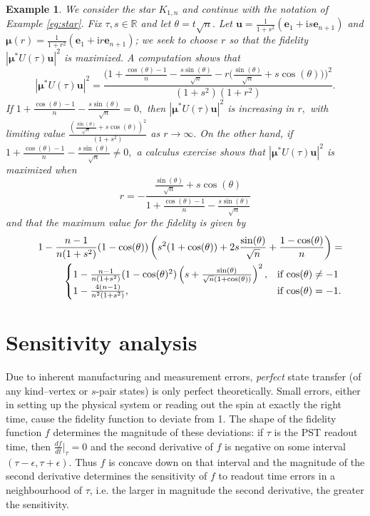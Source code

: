 \documentclass{article}
\numberwithin{equation}{section}
\newtheorem{ex}[lemma]{Example}
\newcommand{\be}{\mathbf e}
\newcommand{\bu}{\mathbf u}
\newcommand{\bmu}{{\boldsymbol{\mu}}}
\def\ii{\mathrm{i}}
\begin{document}
{\begin{ex}\rm{ We consider the star $K_{1,n}$ and continue with the notation of Example \ref{eg:star}. Fix $\tau, s \in \mathbb{R}$ and let $\theta = t\sqrt{n}.$ Let $\bu = \frac{1}{1+s^2}(\be_1+ \ii s\be_{n+1})$ and $\bmu(r) =\frac{1}{1+r^2}(\be_1+ \ii r\be_{n+1})$; we seek to choose $r$ so that the fidelity $|\bmu^*U(\tau)\bu|^2$ is maximized. A computation shows that 
$$|\bmu^*U(\tau)\bu|^2 = \frac{\bigg(1+\frac{ \cos(\theta)-1}{{n}} - \frac{s\sin(\theta)}{\sqrt{n}} - r\big(\frac{\sin(\theta)}{\sqrt{n}} +s\cos(\theta)\big)\bigg)^2 }{(1+s^2)(1+r^2)}. 
$$
If $1+\frac{ \cos(\theta)-1}{{n}} - \frac{s\sin(\theta)}{\sqrt{n}}=0,$ then 
$|\bmu^*U(\tau)\bu|^2$ is increasing in $r,$ with limiting value 
$\frac{(\frac{\sin(\theta)}{\sqrt{n}} +s\cos(\theta))^2 }{(1+s^2)} $ as $r \rightarrow \infty.$ On the other hand, if $1+\frac{ \cos(\theta)-1}{{n}} - \frac{s\sin(\theta)}{\sqrt{n}}\ne 0,$  a calculus exercise shows that $|\bmu^*U(\tau)\bu|^2$  is maximized when $$r = -
\frac{\frac{\sin(\theta)}{\sqrt{n}} +s\cos(\theta)}{1+\frac{ \cos(\theta)-1}{{n}} - \frac{s\sin(\theta)}{\sqrt{n}}}
$$ and that the maximum value for the fidelity is given by
\begin{eqnarray*}
&& 1 -\frac{n-1}{n(1+s^2)}(1-\cos(\theta))\left(s^2(1+\cos(\theta)) +2s\frac{\sin(\theta)}{\sqrt{n}} + \frac{1-\cos(\theta)}{n}\right) = \\
&& \begin{cases} 1 -\frac{n-1}{n(1+s^2)}(1-\cos(\theta)^2) \left(s+ \frac{\sin(\theta)}{\sqrt{n}(1+\cos(\theta))}\right )^2, & \text{if $\cos(\theta)\ne -1$} \\
1-\frac{4(n-1)}{n^2(1+s^2)},  & \text{if $ \cos(\theta)= -1$.} \end{cases} 
\end{eqnarray*}
}
\end{ex}


\section{Sensitivity analysis}\label{sec:sens}

Due to inherent manufacturing and measurement errors, \emph{perfect} state transfer (of any kind--vertex or $s$-pair states) is only perfect theoretically. Small errors, either in setting up the physical system or reading out the spin at exactly the right time, cause the fidelity function to deviate from 1. The shape of the fidelity function $f$ determines the magnitude of these deviations: if $\tau$ is the PST readout time, then $\frac{d f}{d t}\big|_{\tau} =0$ and 
 the second derivative of $f$ is negative on some interval $(\tau -  \epsilon, \tau + \epsilon).$ Thus $f$ is concave down on that interval and the magnitude of the second derivative determines the sensitivity of $f$ to readout time errors in a neighbourhood of $\tau$, i.e. 
 the larger in magnitude the second derivative, the greater the sensitivity.

}
\end{document}
